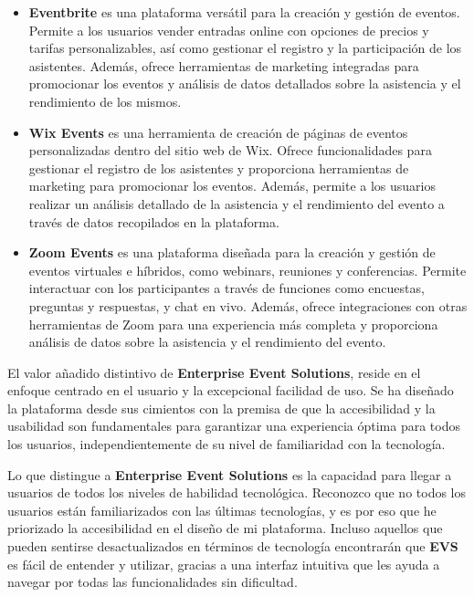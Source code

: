 \begin{itemize}
    \item \textbf{Eventbrite} es una plataforma versátil para la creación y gestión de eventos. Permite a los usuarios vender entradas online 
    con opciones de precios y tarifas personalizables, así como gestionar el registro y la participación de los asistentes. Además, 
    ofrece herramientas de marketing integradas para promocionar los eventos y análisis de datos detallados sobre la asistencia y 
    el rendimiento de los mismos.
    \item \textbf{Wix Events} es una herramienta de creación de páginas de 
    eventos personalizadas dentro del sitio web de Wix. Ofrece funcionalidades para gestionar el registro de los asistentes y 
    proporciona herramientas de marketing para promocionar los eventos. Además, permite a los usuarios realizar un análisis 
    detallado de la asistencia y el rendimiento del evento a través de datos recopilados en la plataforma.
    \item \textbf{Zoom Events} es una plataforma diseñada para la creación y gestión de eventos virtuales e híbridos, como webinars, 
    reuniones y conferencias. Permite interactuar con los participantes a través de funciones como encuestas, preguntas y respuestas, 
    y chat en vivo. Además, ofrece integraciones con otras herramientas de Zoom para una experiencia más completa y proporciona análisis 
    de datos sobre la asistencia y el rendimiento del evento.
\end{itemize}

El valor añadido distintivo de \textbf{Enterprise Event Solutions}, reside en el enfoque centrado en el usuario y la excepcional 
facilidad de uso. Se ha diseñado la plataforma desde sus cimientos con la premisa de que la accesibilidad y la usabilidad son fundamentales 
para garantizar una experiencia óptima para todos los usuarios, independientemente de su nivel de familiaridad con la tecnología.

Lo que distingue a \textbf{Enterprise Event Solutions} es la capacidad para llegar a usuarios de todos los niveles de habilidad tecnológica. 
Reconozco que no todos los usuarios están familiarizados con las últimas tecnologías, y es por eso que he priorizado la accesibilidad en el 
diseño de mi plataforma. Incluso aquellos que pueden sentirse desactualizados en términos de tecnología encontrarán que \textbf{EVS} es fácil 
de entender y utilizar, gracias a una interfaz intuitiva que les ayuda a navegar por todas las funcionalidades sin dificultad.

